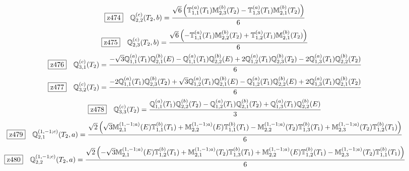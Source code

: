 \documentclass[fleqn,10pt,landscape]{jsarticle}
\begin{document}
\begin{dmath*}
\hspace*{3mm}\fbox{z474}\quad \mathbb{Q}_{2,2}^{(c)}(T_{2},b)=\frac{\sqrt{6} \left(\mathbb{T}_{1,1}^{(a)}(T_{1}) \mathbb{M}_{2,3}^{(b)}(T_{2}) - \mathbb{T}_{1,3}^{(a)}(T_{1}) \mathbb{M}_{2,1}^{(b)}(T_{2})\right)}{6}
\end{dmath*}
\begin{dmath*}
\hspace*{3mm}\fbox{z475}\quad \mathbb{Q}_{2,3}^{(c)}(T_{2},b)=\frac{\sqrt{6} \left(- \mathbb{T}_{1,1}^{(a)}(T_{1}) \mathbb{M}_{2,2}^{(b)}(T_{2}) + \mathbb{T}_{1,2}^{(a)}(T_{1}) \mathbb{M}_{2,1}^{(b)}(T_{2})\right)}{6}
\end{dmath*}
\begin{dmath*}
\hspace*{3mm}\fbox{z476}\quad \mathbb{Q}_{3,1}^{(c)}(T_{2})=\frac{- \sqrt{3} \mathbb{Q}_{1,1}^{(a)}(T_{1}) \mathbb{Q}_{2,1}^{(b)}(E) - \mathbb{Q}_{1,1}^{(a)}(T_{1}) \mathbb{Q}_{2,2}^{(b)}(E) + 2 \mathbb{Q}_{1,2}^{(a)}(T_{1}) \mathbb{Q}_{2,3}^{(b)}(T_{2}) - 2 \mathbb{Q}_{1,3}^{(a)}(T_{1}) \mathbb{Q}_{2,2}^{(b)}(T_{2})}{6}
\end{dmath*}
\begin{dmath*}
\hspace*{3mm}\fbox{z477}\quad \mathbb{Q}_{3,2}^{(c)}(T_{2})=\frac{- 2 \mathbb{Q}_{1,1}^{(a)}(T_{1}) \mathbb{Q}_{2,3}^{(b)}(T_{2}) + \sqrt{3} \mathbb{Q}_{1,2}^{(a)}(T_{1}) \mathbb{Q}_{2,1}^{(b)}(E) - \mathbb{Q}_{1,2}^{(a)}(T_{1}) \mathbb{Q}_{2,2}^{(b)}(E) + 2 \mathbb{Q}_{1,3}^{(a)}(T_{1}) \mathbb{Q}_{2,1}^{(b)}(T_{2})}{6}
\end{dmath*}
\begin{dmath*}
\hspace*{3mm}\fbox{z478}\quad \mathbb{Q}_{3,3}^{(c)}(T_{2})=\frac{\mathbb{Q}_{1,1}^{(a)}(T_{1}) \mathbb{Q}_{2,2}^{(b)}(T_{2}) - \mathbb{Q}_{1,2}^{(a)}(T_{1}) \mathbb{Q}_{2,1}^{(b)}(T_{2}) + \mathbb{Q}_{1,3}^{(a)}(T_{1}) \mathbb{Q}_{2,2}^{(b)}(E)}{3}
\end{dmath*}
\begin{dmath*}
\hspace*{3mm}\fbox{z479}\quad \mathbb{Q}_{2,1}^{(1,-1;c)}(T_{2},a)=\frac{\sqrt{2} \left(\sqrt{3} \mathbb{M}_{2,1}^{(1,-1;a)}(E) \mathbb{T}_{1,1}^{(b)}(T_{1}) + \mathbb{M}_{2,2}^{(1,-1;a)}(E) \mathbb{T}_{1,1}^{(b)}(T_{1}) - \mathbb{M}_{2,2}^{(1,-1;a)}(T_{2}) \mathbb{T}_{1,3}^{(b)}(T_{1}) + \mathbb{M}_{2,3}^{(1,-1;a)}(T_{2}) \mathbb{T}_{1,2}^{(b)}(T_{1})\right)}{6}
\end{dmath*}
\begin{dmath*}
\hspace*{3mm}\fbox{z480}\quad \mathbb{Q}_{2,2}^{(1,-1;c)}(T_{2},a)=\frac{\sqrt{2} \left(- \sqrt{3} \mathbb{M}_{2,1}^{(1,-1;a)}(E) \mathbb{T}_{1,2}^{(b)}(T_{1}) + \mathbb{M}_{2,1}^{(1,-1;a)}(T_{2}) \mathbb{T}_{1,3}^{(b)}(T_{1}) + \mathbb{M}_{2,2}^{(1,-1;a)}(E) \mathbb{T}_{1,2}^{(b)}(T_{1}) - \mathbb{M}_{2,3}^{(1,-1;a)}(T_{2}) \mathbb{T}_{1,1}^{(b)}(T_{1})\right)}{6}
\end{dmath*}
\end{document}

